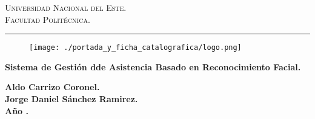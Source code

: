 \documentclass[12pt,a4paper,oneside]{book}
\begin{document}

\renewcommand\listtablename{\'Indice de Tablas}

\renewcommand{\tablename}{Tabla}
\renewcommand{\acronymname}{Acr\'onimos y s\'imbolos}
\renewcommand{\bibname}{Referencias bibliogr\'aficas}
\frontmatter
\vspace*{-3cm}
\begin{figure}[h]
\leavevmode
\begin{minipage}{\textwidth}
\begin{center}
\end{center}
\end{minipage}
\end{figure}

\thispagestyle{empty}

{\bf
\begin{center}
\large
\vspace*{-1 cm}\Large \textsc{Universidad Nacional del Este.} \\
\Large \textsc{Facultad Politécnica.} \\
\vspace*{0.5 cm}\hrule
\end{center}
}

\vspace*{-0.5 cm}
\begin{figure}[htb]
\begin{center}
\texttt{[image: ./portada\_y\_ficha\_catalografica/logo.png]}

\end{center}
\end{figure}


\vspace{3 cm}
{
\noindent
\begin{center}
\huge \bf Sistema de Gestión dde Asistencia Basado en Reconocimiento Facial.
\end{center}
}


\vspace{5 cm}

\begin{center}
{\textbf{\Large Aldo Carrizo Coronel.}\\[5mm]
\textbf{\Large Jorge Daniel Sánchez Ramirez.}\\[5mm]
\vspace{1 cm}
\textbf{Año \the\year.}}
\end{center}

\end{document}
